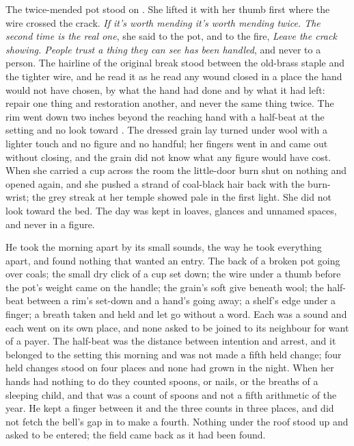 The twice-mended pot stood on . She lifted it with her thumb first where the wire crossed the crack. \emph{If it's worth mending it's worth mending twice. The second time is the real one}, she said to the pot, and to the fire, \emph{Leave the crack showing. People trust a thing they can see has been handled}, and never to a person. The hairline of the original break stood between the old-brass staple and the tighter wire, and he read it as he read any wound closed in a place the hand would not have chosen, by what the hand had done and by what it had left: repair one thing and restoration another, and never the same thing twice. The rim went down two inches beyond the reaching hand with a half-beat at the setting and no look toward . The dressed grain lay turned under wool with a lighter touch and no figure and no handful; her fingers went in and came out without closing, and the grain did not know what any figure would have cost. When she carried a cup across the room the little-door burn shut on nothing and opened again, and she pushed a strand of coal-black hair back with the burn-wrist; the grey streak at her temple showed pale in the first light. She did not look toward the bed. The day was kept in loaves, glances and unnamed spaces, and never in a figure.

He took the morning apart by its small sounds, the way he took everything apart, and found nothing that wanted an entry. The back of a broken pot going over coals; the small dry click of a cup set down; the wire under a thumb before the pot's weight came on the handle; the grain's soft give beneath wool; the half-beat between a rim's set-down and a hand's going away; a shelf's edge under a finger; a breath taken and held and let go without a word. Each was a sound and each went on its own place, and none asked to be joined to its neighbour for want of a payer. The half-beat was the distance between intention and arrest, and it belonged to the setting this morning and was not made a fifth held change; four held changes stood on four places and none had grown in the night. When her hands had nothing to do they counted spoons, or nails, or the breaths of a sleeping child, and that was a count of spoons and not a fifth arithmetic of the year. He kept a finger between it and the three counts in three places, and did not fetch the bell's gap in to make a fourth. Nothing under the roof stood up and asked to be entered; the field came back as it had been found.

